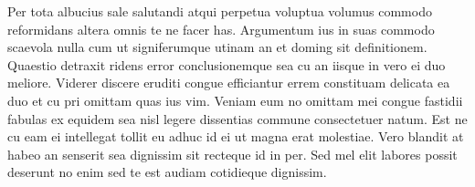 Per tota albucius sale salutandi atqui perpetua voluptua volumus commodo reformidans altera omnis te ne facer has. Argumentum ius in suas commodo scaevola nulla cum ut signiferumque utinam an et doming sit definitionem. Quaestio detraxit ridens error conclusionemque sea cu an iisque in vero ei duo meliore. Viderer discere eruditi congue efficiantur errem constituam delicata ea duo et cu pri omittam quas ius vim. Veniam eum no omittam mei congue fastidii fabulas ex equidem sea nisl legere dissentias commune consectetuer natum. Est ne cu eam ei intellegat tollit eu adhuc id ei ut magna erat molestiae. Vero blandit at habeo an senserit sea dignissim sit recteque id in per. Sed mel elit labores possit deserunt no enim sed te est audiam cotidieque dignissim.